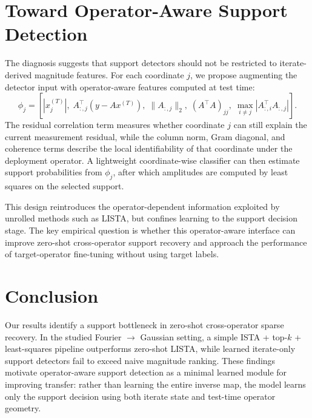\documentclass[conference,10pt]{IEEEtran}
\begin{document}
\section{Toward Operator-Aware Support Detection}

The diagnosis suggests that support detectors should not be restricted to
iterate-derived magnitude features. For each coordinate $j$, we propose
augmenting the detector input with operator-aware features computed at
test time:
\begin{equation}
\phi_j =
\left[
|x^{(T)}_j|,
\; A_{:,j}^{\top}(y-Ax^{(T)}),
\; \|A_{:,j}\|_2,
\; (A^{\top}A)_{jj},
\; \max_{i\neq j}|A_{:,i}^{\top}A_{:,j}|
\right].
\end{equation}
The residual correlation term measures whether coordinate $j$ can still
explain the current measurement residual, while the column norm, Gram
diagonal, and coherence terms describe the local identifiability of that
coordinate under the deployment operator. A lightweight coordinate-wise
classifier can then estimate support probabilities from $\phi_j$, after
which amplitudes are computed by least squares on the selected support.

This design reintroduces the operator-dependent information exploited by
unrolled methods such as LISTA, but confines learning to the support
decision stage. The key empirical question is whether this operator-aware
interface can improve zero-shot cross-operator support recovery and
approach the performance of target-operator fine-tuning without using
target labels.

\section{Conclusion}

Our results identify a support bottleneck in zero-shot cross-operator
sparse recovery. In the studied Fourier $\to$ Gaussian setting, a simple
ISTA + top-$k$ + least-squares pipeline outperforms zero-shot LISTA, while
learned iterate-only support detectors fail to exceed naive magnitude
ranking. These findings motivate operator-aware support detection as a
minimal learned module for improving transfer: rather than learning the
entire inverse map, the model learns only the support decision using both
iterate state and test-time operator geometry.
\end{document}
